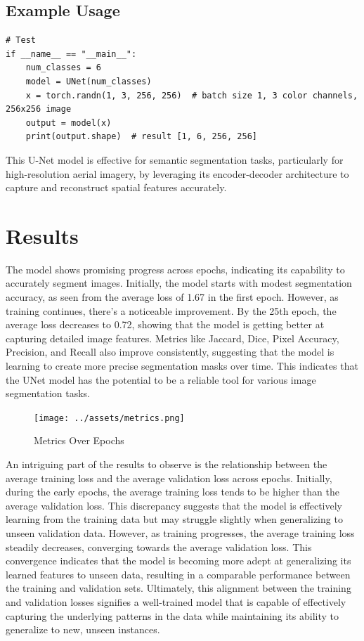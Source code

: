 \documentclass{article}
\begin{document}
\subsection{Example Usage}
\begin{verbatim}
# Test
if __name__ == "__main__":
    num_classes = 6
    model = UNet(num_classes)
    x = torch.randn(1, 3, 256, 256)  # batch size 1, 3 color channels, 256x256 image
    output = model(x)
    print(output.shape)  # result [1, 6, 256, 256]
\end{verbatim}

This U-Net model is effective for semantic segmentation tasks, particularly for high-resolution aerial imagery, by leveraging its encoder-decoder architecture to capture and reconstruct spatial features accurately.

\section{Results}
The  model  shows promising progress across epochs, indicating its capability to accurately segment images. Initially, the model starts with modest segmentation accuracy, as seen from the average loss of 1.67 in the first epoch. However, as training continues, there's a noticeable improvement. By the 25th epoch, the average loss decreases to 0.72, showing that the model is getting better at capturing detailed image features. Metrics like Jaccard, Dice, Pixel Accuracy, Precision, and Recall also improve consistently, suggesting that the model is learning to create more precise segmentation masks over time. This indicates that the UNet model has the potential to be a reliable tool for various image segmentation tasks.

\begin{figure}[htbp]
    \centering
    \texttt{[image: ../assets/metrics.png]}
    \caption{Metrics Over Epochs}
    \label{fig:metrics_over_epochs}
\end{figure}


An intriguing part of the results to observe is the relationship between the average training loss and the average validation loss across epochs. Initially, during the early epochs, the average training loss tends to be higher than the average validation loss. This discrepancy suggests that the model is effectively learning from the training data but may struggle slightly when generalizing to unseen validation data. However, as training progresses, the average training loss steadily decreases, converging towards the average validation loss. This convergence indicates that the model is becoming more adept at generalizing its learned features to unseen data, resulting in a comparable performance between the training and validation sets. Ultimately, this alignment between the training and validation losses signifies a well-trained model that is capable of effectively capturing the underlying patterns in the data while maintaining its ability to generalize to new, unseen instances.
\end{document}
